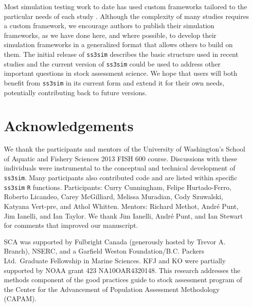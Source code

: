 \documentclass[11pt]{article}
\begin{document}
Most simulation testing work to date has used custom frameworks tailored to the particular needs of each study \cite{helu2000, yin2004, magnusson2007, wetzel2011a, jiao2012, wilberg2006, deroba2013a, deroba2013, crone2013a, hurtadoferro2013}. Although the complexity of many studies requires a custom framework, we encourage authors to publish their simulation frameworks, as we have done here, and where possible, to develop their simulation frameworks in a generalized format that allows others to build on them. The initial release of \texttt{ss3sim} describes the basic structure used in recent studies \cite{johnson2013, ono2013} and the current version of \texttt{ss3sim} could be used to address other important questions in stock assessment science. We hope that users will both benefit from \texttt{ss3sim} in its current form and extend it for their own needs, potentially contributing back to future versions.

\section*{Acknowledgements}

We thank the participants and mentors of the University of Washington's School of Aquatic and Fishery Sciences 2013 FISH 600 course. Discussions with these individuals were instrumental to the conceptual and technical development of \texttt{ss3sim}. Many participants also contributed code and are listed within specific \texttt{ss3sim} \texttt{R} functions. Participants: Curry Cunningham, Felipe Hurtado-Ferro, Roberto Licandeo, Carey McGilliard, Melissa Muradian, Cody Szuwalski, Katyana Vert-pre, and Athol Whitten. Mentors: Richard Methot, Andr\'{e} Punt, Jim Ianelli, and Ian Taylor. We thank Jim Ianelli, Andr\'{e} Punt, and Ian Stewart for comments that improved our manuscript.

SCA was supported by Fulbright Canada (generously hosted by Trevor A. Branch), NSERC, and a Garfield Weston Foundation/B.C. Packers Ltd.~Graduate Fellowship in Marine Sciences. KFJ and KO were partially supported by NOAA grant 423 NA10OAR4320148. This research addresses the methods component of the good practices guide to stock assessment program of the Center for the Advancement of Population Assessment Methodology (CAPAM).
\end{document}
